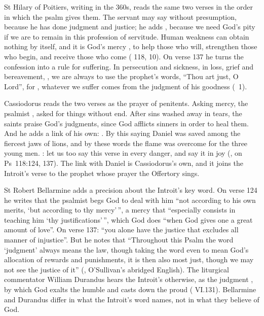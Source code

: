 St Hilary of Poitiers, writing in the 360s, reads the same two verses in
the order in which the psalm gives them. The servant may say
 without presumption, because he has done judgment and justice; he
adds  , because we need God's pity
if we are to remain in this profession of servitude. Human weakness can obtain
nothing by itself, and it is God's mercy , to help those who will, strengthen
those who begin, and receive those who come (
118,  10). On verse 137 he turns the confession into a rule for
suffering. In persecution and sickness, in loss, grief and bereavement,
, we are always to use the prophet's words, ``Thou art just, O Lord'',
for ,
whatever we suffer comes from the judgment of his goodness (~1).

Cassiodorus reads the two verses as the prayer of penitents.
Asking mercy, the psalmist , asked for things without
end. After sins washed away in tears, the saints praise God's judgments, since
God afflicts sinners in order to heal them. And he adds a link of his own:
. By this saying Daniel was saved
among the fiercest jaws of lions, and by these words the flame was overcome
for the three young men. : let us too say this verse in
every danger, and say it in joy (, on Ps~118:124,
137). The link with Daniel is Cassiodorus's own, and it joins the Introit's
verse to the prophet whose prayer the Offertory sings.

St Robert Bellarmine adds a precision about the Introit's key word. On verse
124 he writes that the psalmist begs God to deal with him ``not according to
his own merits, `but according to thy mercy'\,'', a mercy that ``especially
consists in teaching him `thy justifications'\,'', which God does ``when God
gives one a great amount of love''. On verse 137: ``you alone have the justice
that excludes all manner of injustice''. But he notes that ``Throughout this
Psalm the word `judgment' always means the law, though taking the word even to
mean God's allocation of rewards and punishments, it is then also most just,
though we may not see the justice of it'' (,
O'Sullivan's abridged English). The liturgical commentator William Durandus
hears the Introit's  otherwise, as the judgment
, by which God exalts
the humble and casts down the proud ( VI.131). Bellarmine and
Durandus differ in what the Introit's word names, not in what they believe of
God.

